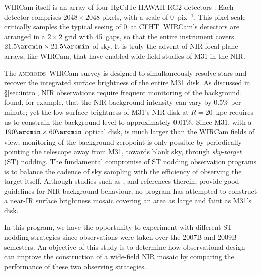 \documentclass[iop]{emulateapj}
\newcommand{\androids}{\textsc{androids}}
\newcommand{\Sec}[1]{\S\ref{sec:#1}}  %
\begin{document}
WIRCam itself is an array of four HgCdTe HAWAII-RG2 detectors \citep{Puget:2004}.
Each detector comprises $2048\times 2048$ pixels, with a scale of 0~pix$^{-1}$.
This pixel scale critically samples the typical seeing of 0~at CFHT\@.
WIRCam's detectors are arranged in a $2\times 2$ grid with 45\arcsec~gaps, so that the entire instrument covers $21.5\arcmin \times 21.5\arcmin$ of sky.
It is truly the advent of NIR focal plane arrays, like WIRCam, that have enabled wide-field studies of M31 in the NIR.

The \androids\ WIRCam survey is designed to simultaneously resolve stars and recover the integrated surface brightness of the entire M31 disk.
As discussed in \Sec{intro}, NIR observations require frequent monitoring of the background.
\cite{Vaduvescu:2004} found, for example, that the NIR background intensity can vary by 0.5\% per minute; yet the low surface brightness of M31's NIR disk at $R=20$~kpc requires us to constrain the background level to approximately 0.01\%.
Since M31, with a $190\arcmin \times 60\arcmin$ optical disk, is much larger than the WIRCam fields of view, monitoring of the background zeropoint is only possible by periodically pointing the telescope away from M31, towards blank sky, through \emph{sky-target} (ST) nodding. 
The fundamental compromise of ST nodding observation programs is to balance the cadence of sky sampling with the efficiency of observing the target itself.
Although studies such as \cite{Vaduvescu:2004}, and references therein, provide good guidelines for NIR background behaviour, no program has attempted to construct a near-IR surface brightness mosaic covering an area as large and faint as M31's disk.

In this program, we have the opportunity to experiment with different ST nodding strategies since observations were taken over the 2007B and 2009B semesters.
An objective of this study is to determine how observational design can improve the construction of a wide-field NIR mosaic by comparing the performance of these two observing strategies.
\end{document}
